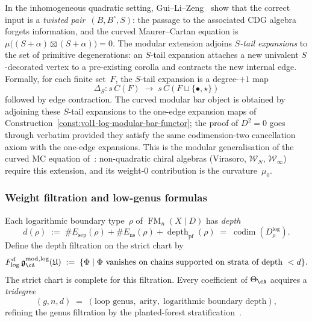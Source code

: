 \begin{construction}
\label{const:vol1-curved-modular-bar}
In the inhomogeneous quadratic setting,
Gui--Li--Zeng~\cite{GLZ22} show that the correct input is a
\emph{twisted pair}~$(B, B^\circ, S)$: the passage to the
associated CDG algebra forgets information, and the curved
Maurer--Cartan equation is
$\mu\bigl((S + \alpha) \boxtimes (S + \alpha)\bigr) = 0$.
The modular extension adjoins \emph{$S$-tail expansions} to the
set of primitive degenerations: an $S$-tail expansion attaches a
new univalent $S$-decorated vertex to a pre-existing corolla and
contracts the new internal edge.  Formally, for each finite
set~$F$, the $S$-tail expansion is a degree-$+1$ map
\[
\Delta_S\colon s\,C(F)
\;\longrightarrow\;
s\,C(F \sqcup \{\bullet, \star\})
\]
followed by edge contraction.  The curved modular bar object is
obtained by adjoining these $S$-tail expansions to the one-edge
expansion maps of
Construction~\ref{const:vol1-log-modular-bar-functor}; the proof
of $D^2 = 0$ goes through verbatim provided they satisfy the same
codimension-two cancellation axiom with the one-edge expansions.
This is the modular generalisation of the curved MC equation
of~\cite{GLZ22}: non-quadratic chiral algebras (Virasoro,
$\mathcal{W}_N$, $\mathcal{W}_\infty$) require this extension,
and its weight-$0$ contribution is the curvature~$\mu_0$.
\end{construction}

\subsubsection{Weight filtration and low-genus formulas}

\begin{definition}
\label{def:vol1-rigid-planted-forest-depth-filtration}
Each logarithmic boundary type~$\rho$ of
$\operatorname{FM}_n(X\mathbin{|}D)$ has \emph{depth}
\[
d(\rho)
\;:=\;
\#E_{\mathrm{sep}}(\rho)
+\#E_{\mathrm{ns}}(\rho)
+\operatorname{depth}_{\mathrm{pf}}(\rho)
\;=\;
\operatorname{codim}(D^{\log}_\rho).
\]
Define the depth filtration on the strict chart by
\[
F^d_{\log}\,\mathfrak{g}^{\mathrm{mod},\log}_{\cA}(\mathfrak{U})
\;:=\;
\{\Phi\mid \Phi\text{ vanishes on chains supported on strata of
depth }<d\}.
\]
The strict chart is complete for this filtration.  Every coefficient
of $\Theta_\cA$ acquires a \emph{tridegree}
\[
(g,n,d)
\;=\;
(\text{loop genus},\;\text{arity},\;\text{logarithmic boundary
depth}),
\]
refining the genus filtration by the planted-forest
stratification~\cite[Theorem~3.3.1]{Mok25}.
\end{definition}

